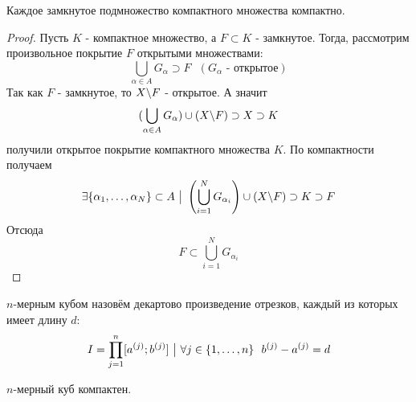 \begin{theorem}
	Каждое замкнутое подмножество компактного множества компактно.
\end{theorem}

\begin{proof}
	Пусть $K$ - компактное множество, а $F \subset K$ - замкнутое. Тогда, рассмотрим произвольное покрытие $F$ открытыми множествами:
	\[
		\bigcup\limits_{\alpha \in A} G_\alpha \supset F\ \ \ (G_\alpha \text{ - открытое})
	\]
	Так как $F$ - замкнутое, то $X \backslash F$ - открытое. А значит
	\[
		(\bigcup\limits_{\alpha \in A} G_\alpha) \cup (X \backslash F) \supset X \supset K
	\]
	получили открытое покрытие компактного множества $K$. По компактности получаем
	\[
		\exists \{\alpha_1, \ldots, \alpha_N\} \subset A \ \big|\  \left(\bigcup\limits_{i = 1}^N G_{\alpha_i}\right) \cup (X \backslash F) \supset K \supset F
	\]
	Отсюда
	\[
		F \subset \bigcup\limits_{i = 1}^N G_{\alpha_i}
	\]
\end{proof}

\begin{definition}
	$n$-мерным кубом назовём декартово произведение отрезков, каждый из которых имеет длину $d$:
	\[
		I = \prod\limits_{j = 1}^n [a^{(j)}; b^{(j)}] \ \big|\  \forall j \in \{1, \ldots, n\}\ \ b^{(j)} - a^{(j)} = d
	\]
\end{definition}

\begin{theorem}
	$n$-мерный куб компактен.
\end{theorem}


